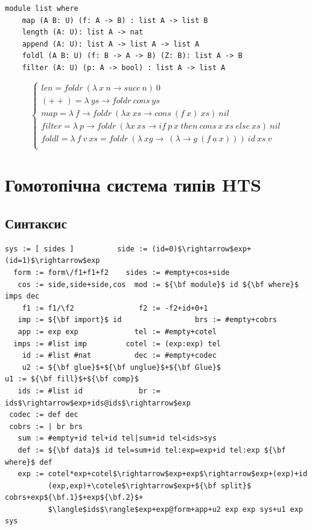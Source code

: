 \begin{lstlisting}[mathescape=true]
module list where
    map (A B: U) (f: A -> B) : list A -> list B
    length (A: U): list A -> nat
    append (A: U): list A -> list A -> list A
    foldl (A B: U) (f: B -> A -> B) (Z: B): list A -> B
    filter (A: U) (p: A -> bool) : list A -> list A
\end{lstlisting}
$$
\begin{cases}
len = foldr\ (\lambda\ x\ n \rightarrow succ\ n)\ 0\\
(++) = \lambda\ ys \rightarrow foldr\ cons\ ys\\
map = \lambda\ f \rightarrow foldr\ (\lambda x\ xs \rightarrow cons\ (f\ x)\ xs)\ nil\\
filter = \lambda\ p \rightarrow foldr\ (\lambda x\ xs \rightarrow if\ p\ x\ then\ cons\ x\ xs\ else\ xs)\ nil\\
foldl = \lambda\ f\ v\ xs = foldr\ (\lambda\ xg\rightarrow\ (\lambda \rightarrow g\ (f\ a\ x)))\ id\ xs\ v\\
\end{cases}
$$

\newpage
\section{Гомотопічна система типів HTS}

\subsection{Синтаксис}

\begin{lstlisting}[mathescape=true]
   sys := [ sides ]          side := (id=0)$\rightarrow$exp+(id=1)$\rightarrow$exp
  form := form\/f1+f1+f2    sides := #empty+cos+side
   cos := side,side+side,cos  mod := ${\bf module}$ id ${\bf where}$ imps dec
    f1 := f1/\f2               f2 := -f2+id+0+1
   imp := ${\bf import}$ id                 brs := #empty+cobrs
   app := exp exp             tel := #empty+cotel
  imps := #list imp         cotel := (exp:exp) tel
    id := #list #nat          dec := #empty+codec
    u2 := ${\bf glue}$+${\bf unglue}$+${\bf Glue}$                   u1 := ${\bf fill}$+${\bf comp}$
   ids := #list id             br := ids$\rightarrow$exp+ids@ids$\rightarrow$exp
 codec := def dec
 cobrs := | br brs
   sum := #empty+id tel+id tel|sum+id tel<ids>sys   
   def := ${\bf data}$ id tel=sum+id tel:exp=exp+id tel:exp ${\bf where}$ def
   exp := cotel*exp+cotel$\rightarrow$exp+exp$\rightarrow$exp+(exp)+id
          (exp,exp)+\cotele$\rightarrow$exp+${\bf split}$ cobrs+exp${\bf.1}$+exp${\bf.2}$+
          $\langle$ids$\rangle$exp+exp@form+app+u2 exp exp sys+u1 exp sys
\end{lstlisting}


